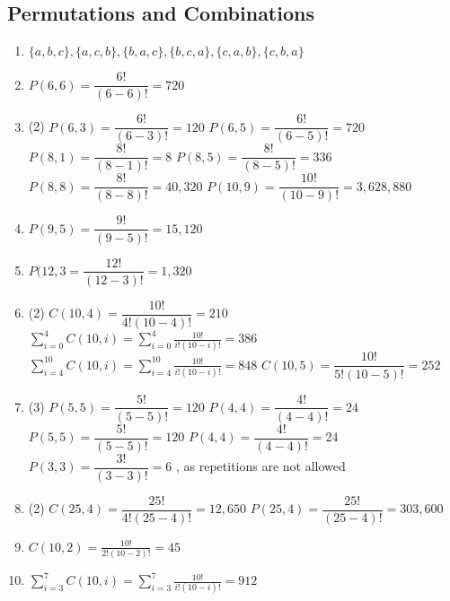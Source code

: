 \documentclass[12pt, A4]{article}
\begin{document}
		\subsection{Permutations and Combinations}
			\begin{enumerate}
				\item
					\(\{a, b, c\}, \{a, c, b\}, \{b, a, c\}, \{b, c, a\}, \{c, a, b\}, \{c, b, a\}\)
				\setcounter{enumi}{2}
				\item
					\(P(6, 6) = \dfrac{6!}{(6 - 6)!} = 720\)
				\setcounter{enumi}{4}
				\item
					\begin{tasks}(2)
						\task
							\(P(6, 3) = \dfrac{6!}{(6 - 3)!} = 120\)
						\task
							\(P(6, 5) = \dfrac{6!}{(6 - 5)!} = 720\)
						\task
							\(P(8, 1) = \dfrac{8!}{(8 - 1)!} = 8\)
						\task
							\(P(8, 5) = \dfrac{8!}{(8 - 5)!} = 336\)
						\task
							\(P(8, 8) = \dfrac{8!}{(8 - 8)!} = 40,320\)
						\task
							\(P(10, 9) = \dfrac{10!}{(10 - 9)!} = 3,628,880\) 
					\end{tasks}
				\setcounter{enumi}{6}
				\item
					\(P(9, 5) = \dfrac{9!}{(9 - 5)!} = 15,120\)
				\setcounter{enumi}{8}
				\item
					\(P(12, 3 = \dfrac{12!}{(12 - 3)!} = 1,320\)
				\setcounter{enumi}{10}
				\item
					\begin{tasks}(2)
						\task
							\(C(10, 4) = \dfrac{10!}{4!(10 - 4)!} = 210\)
						\task
							\(\displaystyle \sum_{i = 0}^4 C(10, i) = \sum_{i = 0}^4 \frac{10!}{i!(10 - i)!} = 386\)
						\task
							\(\displaystyle \sum_{i = 4}^{10} C(10, i) = \sum_{i = 4}^{10} \frac{10!}{i!(10 - i)!} = 848\)
						\task
							\(C(10, 5) = \dfrac{10!}{5!(10 - 5)!} = 252\)
					\end{tasks}
				\setcounter{enumi}{20}
				\item
					\begin{tasks}(3)
						\task
							\(P(5, 5) = \dfrac{5!}{(5 - 5)!} = 120\)	
						\task
							\(P(4, 4) = \dfrac{4!}{(4 - 4)!} = 24\)
						\task
							\(P(5, 5) = \dfrac{5!}{(5 - 5)!} = 120\)
						\task
							\(P(4, 4) = \dfrac{4!}{(4 - 4)!} = 24\)
						\task
							\(P(3, 3) = \dfrac{3!}{(3 - 3)!} = 6\)
						, as repetitions are not allowed
					\end{tasks}
				\setcounter{enumi}{28}
				\item
					\begin{tasks}(2)
						\task
							\(C(25, 4) = \dfrac{25!}{4!(25 - 4)!} = 12,650\)
						\task
							\(P(25, 4) = \dfrac{25!}{(25 - 4)!} = 303,600\)
					\end{tasks}
				\setcounter{enumi}{36}
				\item
					\(C(10, 2) = \frac{10!}{2!(10 - 2)!} = 45\)
				\setcounter{enumi}{38}
				\item
					\(\displaystyle \sum_{i = 3}^{7}C(10, i) = \sum_{i = 3}^7 \frac{10!}{i!(10 - i)!} = 912\)
			\end{enumerate}
		\setcounter{subsection}{3}
\end{document}
